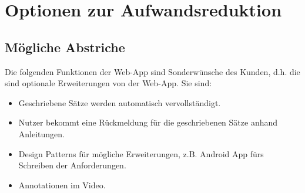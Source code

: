 \section{Optionen zur Aufwandsreduktion}

	\subsection{Mögliche Abstriche}
	Die folgenden Funktionen der Web-App sind Sonderwünsche des Kunden, d.h. die sind optionale Erweiterungen von der Web-App. Sie sind:
	\begin{itemize}
		\item Geschriebene Sätze werden automatisch vervollständigt.
		\item Nutzer bekommt eine Rückmeldung für die geschriebenen Sätze anhand Anleitungen.
		\item Design Patterns für mögliche Erweiterungen, z.B. Android App fürs Schreiben der Anforderungen.
		\item Annotationen im Video.
	\end{itemize}
	
